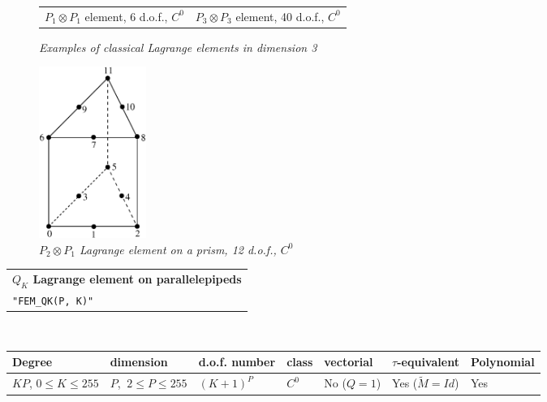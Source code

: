 \documentclass[10pt,a4paper]{article}
\begin{document}
\begin{figure}[H]
\begin{center}
\begin{tabular}{m{7cm}m{7cm}}
    $P_1 \otimes P_1$ element, 6 d.o.f., $C^0$ & $P_3 \otimes P_3$ element, 40 d.o.f., $C^0$ \\
  \end{tabular} \end{center}
  \caption{ \it Examples of classical Lagrange elements in dimension 3} \label{fig:prodpktrois}
\end{figure}
\begin{figure}[H]
  \begin{center}
    \includegraphics[width=3.5cm,angle=0]{getfemlist_prism_P2_P1.eps}
  \end{center}
  \caption{ \it $P_2 \otimes P_1$ Lagrange element on a prism, 12 d.o.f., $C^0$} 
  \label{fig:prism_P2_p1}
\end{figure}


\begin{center}
\begin{tabular}{|m{16.109cm}|} \hline 
{\bf $Q_K$ Lagrange element on parallelepipeds}\\
{\tt "FEM\_QK(P, K)"} 
\end{tabular} \\ \vspace{-1pt} 
\begin{tabular}{|m{2cm}|m{2cm}|m{2.5cm}|m{1.5cm}|m{1.5cm}|m{2cm}|m{2cm}|} \hline 
Degree & dimension & d.o.f. number & class & vectorial & \mbox{$\tau$-equivalent} & Polynomial \\ \hline
\small $KP$, \mbox{$0 \leq K \leq 255$} & \small $P$, \mbox{$\ 2 \leq P \leq 255$} & $(K+1)^P$ & $C^0$ & No \mbox{($Q = 1$)} & Yes \mbox{($\tilde{M} = Id$)}  & Yes \\ \hline
\end{tabular}
\end{center}
\end{document}
